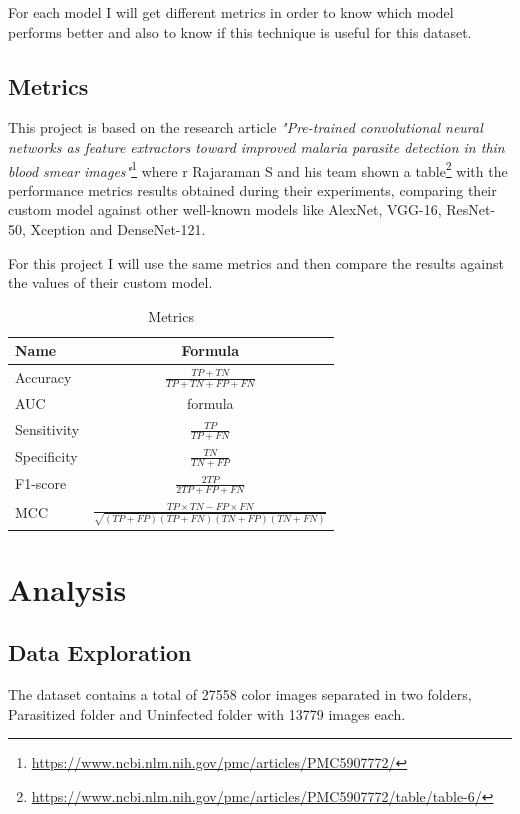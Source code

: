 \documentclass[a4paper]{article}
\begin{document}
	\medskip
	For each model I will get different metrics in order to know which model performs better and also to know if this technique is useful for this dataset.
	
	\subsection{Metrics}
	This project is based on the research article \textit{"Pre-trained convolutional neural networks as feature extractors toward improved malaria parasite detection in thin blood smear images"}\footnote{\label{research_paper}\url{https://www.ncbi.nlm.nih.gov/pmc/articles/PMC5907772/}} where r Rajaraman S and his
	team shown a table\footnote{\label{table_metrics}\url{https://www.ncbi.nlm.nih.gov/pmc/articles/PMC5907772/table/table-6/}} with the performance metrics results obtained during their experiments,
	comparing their custom model against other well-known models like AlexNet, VGG-16,
	ResNet-50, Xception and DenseNet-121.
	
	\medskip
	For this project I will use the same metrics and then compare the results against the values of
	their custom model.		
	
	\begin{table}[h!]
		\begin{center}
			\caption{Metrics}
			{\renewcommand{\arraystretch}{2}%
			\begin{tabular}{l|c}
				\textbf{Name} & \textbf{Formula} \\
				\hline
				Accuracy & $ \frac{TP + TN}{TP + TN + FP + FN} $ \\
				AUC & formula \\
				Sensitivity & $ \frac{TP}{TP + FN} $ \\
				Specificity & $ \frac{TN}{TN + FP} $ \\
				F1-score & $ \frac{2TP}{2TP + FP + FN} $ \\
				MCC & $ \frac{TP \times TN - FP \times FN}{\sqrt{(TP + FP)(TP + FN)(TN + FP)(TN + FN)}} $ \\
			\end{tabular}} \quad
		\end{center}
	\end{table}

\newpage

	\section{Analysis}
	\subsection{Data Exploration}	
	The dataset contains a total of 27558 color images separated in two folders, Parasitized folder and
	Uninfected folder with 13779 images each.
	
\end{document}
